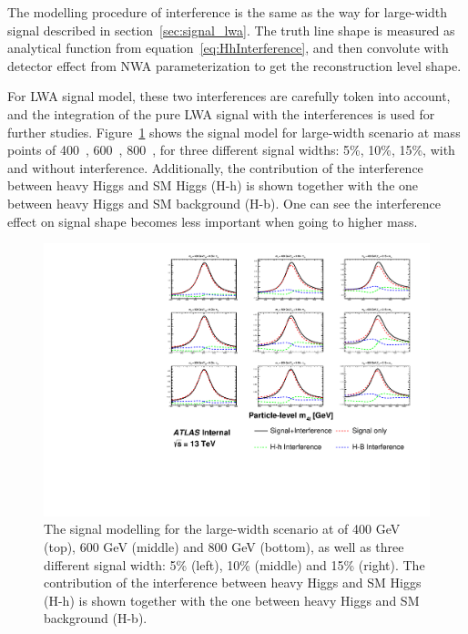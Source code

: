 The modelling procedure of interference is the same as the way for large-width signal described in section~\ref{sec:signal_lwa}.
The truth line shape is measured as analytical function from equation~\ref{eq:HhInterference}, and then convolute with detector effect from NWA parameterization to get the reconstruction level shape.

For LWA signal model, these two interferences are carefully token into account, and the integration of the pure LWA signal with the interferences is used for further studies.
Figure~\ref{fig:LWASignalModel} shows the signal model for large-width scenario at mass points of 400~\gev, 600~\gev, 800~\gev, for three different signal widths: 5\%, 10\%, 15\%, with and without interference.
Additionally, the contribution of the interference between heavy Higgs and SM Higgs (H-h) is shown together with the one between heavy Higgs and SM \ggZZ background (H-b).
One can see the interference effect on signal shape becomes less important when going to higher mass.

\begin{figure}[htbp]
    \centering
    \includegraphics[width=1.0\textwidth]{figures/HMHZZ/signal/LWA/LWAModel.pdf}
    \caption{The signal modelling for the large-width scenario at \mH of 400 GeV (top), 600 GeV (middle) and 800 GeV (bottom), as well as three different signal width:  5\%  (left), 10\%  (middle) and 15\% (right). 
    The contribution of the interference between heavy Higgs and SM Higgs (H-h) is shown together with the one between heavy Higgs and SM \ggZZ background (H-b).}
    \label{fig:LWASignalModel}
\end{figure}


